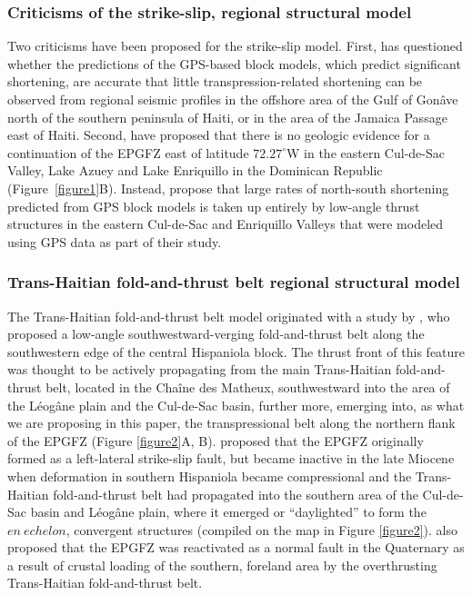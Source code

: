 \documentclass[linenumbers,draft]{agujournal}
\begin{document}
\subsubsection{Criticisms of the strike-slip, regional structural model}
Two criticisms have been proposed for the strike-slip model. First, \citet{corbeau2016transpressive} has questioned whether the predictions of the GPS-based block models, which predict significant shortening, are accurate that little transpression-related shortening can be observed from regional seismic profiles in the offshore area of the Gulf of Gon\^ave north of the southern peninsula of Haiti, or in the area of the Jamaica Passage east of Haiti. Second, \citet{symithe2016present} have proposed that there is no geologic evidence for a continuation of the EPGFZ east of latitude $72.27^{\circ}$W in the eastern Cul-de-Sac Valley, Lake Azuey and Lake Enriquillo in the Dominican Republic (Figure~\ref{figure1}B). Instead, \citet{symithe2016present} propose that large rates of north-south shortening predicted from GPS block models is taken up entirely by low-angle thrust structures in the eastern Cul-de-Sac and Enriquillo Valleys that were modeled using GPS data as part of their study.

\subsubsection{Trans-Haitian fold-and-thrust belt regional structural model}
The Trans-Haitian fold-and-thrust belt model originated with a study by \citet{pubellier2000plate}, who proposed a low-angle southwestward-verging fold-and-thrust belt along the southwestern edge of the central Hispaniola block. The thrust front of this feature was thought to be actively propagating from the main Trans-Haitian fold-and-thrust belt, located in the Cha\^ine des Matheux, southwestward into the area of the L\'eog\^ane plain and the Cul-de-Sac basin, further more, emerging into, as what we are proposing in this paper, the transpressional belt along the northern flank of the EPGFZ (Figure \ref{figure2}A, B). \citet{pubellier2000plate} proposed that the EPGFZ originally formed as a left-lateral strike-slip fault, but became inactive in the late Miocene when deformation in southern Hispaniola became compressional and the Trans-Haitian fold-and-thrust belt had propagated into the southern area of the Cul-de-Sac basin and L\'eog\^ane plain, where it emerged or ``daylighted'' to form the $en~echelon$, convergent structures (compiled on the map in Figure \ref{figure2}). \citet{pubellier2000plate} also proposed that the EPGFZ was reactivated as a normal fault in the Quaternary as a result of crustal loading of the southern, foreland area by the overthrusting Trans-Haitian fold-and-thrust belt. 
\end{document}
